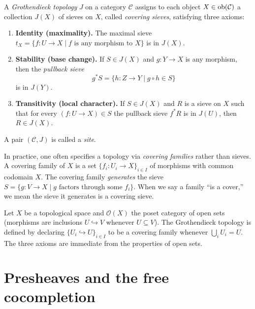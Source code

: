 \begin{definition}
\label{def:grothendieck-topology}
A \emph{Grothendieck topology} $J$ on a category $\mathcal{C}$ assigns
to each object $X \in \mathrm{ob}(\mathcal{C})$ a collection $J(X)$ of sieves
on $X$, called \emph{covering sieves}, satisfying three axioms:
\begin{enumerate}
\item \textbf{Identity (maximality).}
  The maximal sieve
  $t_X = \{f : U \to X \mid f \text{ is any morphism to } X\}$
  is in $J(X)$.

\item \textbf{Stability (base change).}
  If $S \in J(X)$ and $g : Y \to X$ is any morphism, then the
  \emph{pullback sieve}
  \[
    g^* S = \{h : Z \to Y \mid g \circ h \in S\}
  \]
  is in $J(Y)$.

\item \textbf{Transitivity (local character).}
  If $S \in J(X)$ and $R$ is a sieve on $X$ such that for every
  $(f : U \to X) \in S$ the pullback sieve $f^* R$ is in $J(U)$, then
  $R \in J(X)$.
\end{enumerate}
A pair $(\mathcal{C}, J)$ is called a \emph{site}.
\end{definition}

\begin{remark}
\label{rem:covering-families}
In practice, one often specifies a topology via \emph{covering
families} rather than sieves.  A covering family of $X$ is a set
$\{f_i : U_i \to X\}_{i \in I}$ of morphisms with common codomain
$X$.  The covering family \emph{generates} the sieve
$S = \{g : V \to X \mid g \text{ factors through some } f_i\}$.
When we say a family ``is a cover,'' we mean the sieve it generates is
a covering sieve.
\end{remark}

\begin{example}
\label{ex:classical-site}
Let $X$ be a topological space and $\mathcal{O}(X)$ the poset category
of open sets (morphisms are inclusions $U \hookrightarrow V$ whenever
$U \subseteq V$).  The Grothendieck topology is defined by declaring
$\{U_i \hookrightarrow U\}_{i \in I}$ to be a covering family whenever
$\bigcup_{i} U_i = U$.  The three axioms are immediate from the
properties of open sets.
\end{example}



\section{Presheaves and the free cocompletion}
\label{sec:sites:presheaves}

